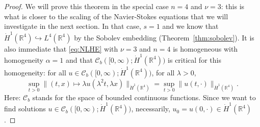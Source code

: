 \documentclass[a4paper, 12pt]{article}
\theoremstyle{plain}
\theoremstyle{definition}
\theoremstyle{remark}
\numberwithin{equation}{section}
\begin{document}
\begin{proof}
We will prove this theorem in the special case $n=4$ and $\nu=3$: this is what is closer to the scaling of the Navier-Stokes equations that 
we will investigate in the next section. In that case, $s=1$ and we know that $\dot H^1({\mathds{R}}^4)\hookrightarrow L^4({\mathds{R}}^4)$
by the Sobolev embedding (Theorem~\ref{thm:sobolev}). It is also immediate that \eqref{eq:NLHE} with $\nu=3$ and $n=4$ is homogeneous
with homogeneity $\alpha=1$ and that ${\mathscr{C}}_b([0,\infty);\dot H^1({\mathds{R}}^4))$ is critical for this homogeneity:
for all $u\in {\mathscr{C}}_b([0,\infty);\dot H^1({\mathds{R}}^4))$, for all $\lambda>0$,
%
\begin{equation}
\label{eq:dotH1critical}
\sup_{t>0}\|(t,x)\mapsto \lambda u(\lambda^2t,\lambda x)\|_{\dot H^1({\mathds{R}}^4)} =
\sup_{t>0}\|u(t,\cdot)\|_{\dot H^1({\mathds{R}}^4)}.
\end{equation}
%
Here: ${\mathscr{C}}_b$ stands for the space of bounded continuous functions. Since we want to find solutions 
$u\in {\mathscr{C}}_b([0,\infty);\dot H^1({\mathds{R}}^4))$, necessarily, $u_0=u(0,\cdot) \in \dot H^1({\mathds{R}}^4)$.


\end{proof}
\end{document}
